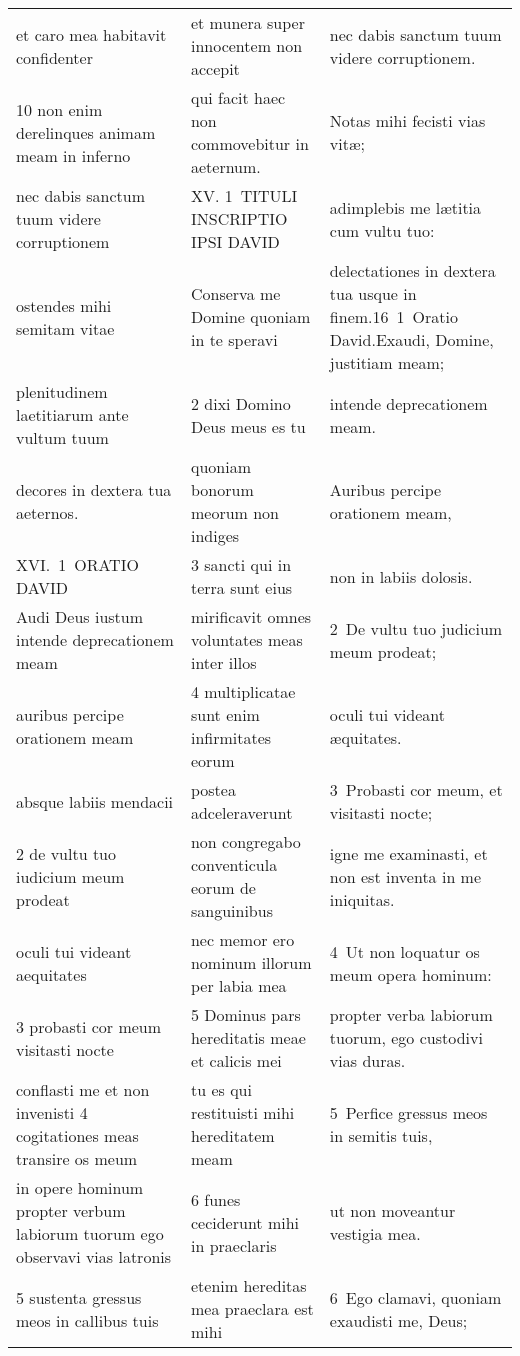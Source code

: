 \documentclass{article}
\begin{document}
\begin{longtable}{@{}p{}p{}p{}@{}}
et caro mea habitavit confidenter	&	et munera super innocentem non accepit	&	nec dabis sanctum tuum videre corruptionem.	\\
10 non enim derelinques animam meam in inferno	&	qui facit haec non commovebitur in aeternum.	&	Notas mihi fecisti vias vitæ;	\\
nec dabis sanctum tuum videre corruptionem	&	XV. 1 TITULI INSCRIPTIO IPSI DAVID	&	adimplebis me lætitia cum vultu tuo:	\\
ostendes mihi semitam vitae	&	Conserva me Domine quoniam in te speravi	&	delectationes in dextera tua usque in finem.16 1 Oratio David.Exaudi, Domine, justitiam meam;	\\
plenitudinem laetitiarum ante vultum tuum	&	2 dixi Domino Deus meus es tu	&	intende deprecationem meam.	\\
decores in dextera tua aeternos.	&	quoniam bonorum meorum non indiges	&	Auribus percipe orationem meam,	\\
XVI. 1 ORATIO DAVID	&	3 sancti qui in terra sunt eius	&	non in labiis dolosis.	\\
Audi Deus iustum intende deprecationem meam	&	mirificavit omnes voluntates meas inter illos	&	2 De vultu tuo judicium meum prodeat;	\\
auribus percipe orationem meam	&	4 multiplicatae sunt enim infirmitates eorum	&	oculi tui videant æquitates.	\\
absque labiis mendacii	&	postea adceleraverunt	&	3 Probasti cor meum, et visitasti nocte;	\\
2 de vultu tuo iudicium meum prodeat	&	non congregabo conventicula eorum de sanguinibus	&	igne me examinasti, et non est inventa in me iniquitas.	\\
oculi tui videant aequitates	&	nec memor ero nominum illorum per labia mea	&	4 Ut non loquatur os meum opera hominum:	\\
3 probasti cor meum visitasti nocte	&	5 Dominus pars hereditatis meae et calicis mei	&	propter verba labiorum tuorum, ego custodivi vias duras.	\\
conflasti me et non invenisti 4 cogitationes meas transire os meum	&	tu es qui restituisti mihi hereditatem meam	&	5 Perfice gressus meos in semitis tuis,	\\
in opere hominum propter verbum labiorum tuorum ego observavi vias latronis	&	6 funes ceciderunt mihi in praeclaris	&	ut non moveantur vestigia mea.	\\
5 sustenta gressus meos in callibus tuis	&	etenim hereditas mea praeclara est mihi	&	6 Ego clamavi, quoniam exaudisti me, Deus;	\\

\end{longtable}
\end{document}
